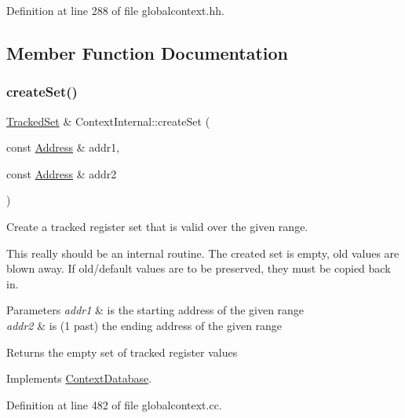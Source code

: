 Definition at line 288 of file globalcontext.\+hh.



\subsection{Member Function Documentation}
\mbox{\label{class_context_internal_aa3e2cdba48dac0da0a63c023b96fd07a}} 
\subsubsection{\texorpdfstring{createSet()}{createSet()}}
{\footnotesize\ttfamily \mbox{\hyperlink{globalcontext_8hh_a7559d2c55c5d12fbbaf0418733b62438}{Tracked\+Set}} \& Context\+Internal\+::create\+Set (\begin{DoxyParamCaption}\item[{const \mbox{\hyperlink{class_address}{Address}} \&}]{addr1,  }\item[{const \mbox{\hyperlink{class_address}{Address}} \&}]{addr2 }\end{DoxyParamCaption})\hspace{0.3cm}{\ttfamily [virtual]}}



Create a tracked register set that is valid over the given range. 

This really should be an internal routine. The created set is empty, old values are blown away. If old/default values are to be preserved, they must be copied back in. 
\begin{DoxyParams}{Parameters}
{\em addr1} & is the starting address of the given range \\
\hline
{\em addr2} & is (1 past) the ending address of the given range \\
\hline
\end{DoxyParams}
\begin{DoxyReturn}{Returns}
the empty set of tracked register values 
\end{DoxyReturn}


Implements \mbox{\hyperlink{class_context_database_aba61e2244e4c12105ed5b45a47720808}{Context\+Database}}.



Definition at line 482 of file globalcontext.\+cc.

